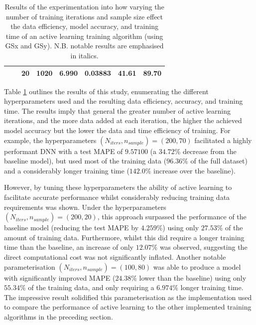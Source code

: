 \documentclass[a4paper, 11pt]{report}
\begin{document}
\begin{table}[ht]
\begin{tabular}{|l|l|l|l|l|l|l|l|}
        \cline{3-8}
                                                                                &                                                                                 & 20                                                                     & 1020                                                                       & 6.990                                                                                             & 0.03883          & 41.61          & 89.70                                                                       \\
        \hline
        \end{tabular}
        \caption{\centering Results of the experimentation into how varying the number of training iterations and sample size effect the data efficiency, model accuracy, and training time of an active learning training algorithm (using GSx and GSy). N.B. notable results are emphasised in italics.}
        \label{table: al-efficiency}
    \end{table}


    Table \ref{table: al-efficiency} outlines the results of this study, enumerating the different hyperparameters used and the resulting data efficiency, accuracy, and training time. The results imply that general the greater number of active learning iterations, and the more data added at each iteration, the higher the achieved model accuracy but the lower the data and time efficiency of training. For example, the hyperparameters $(N_{iters}, n_{sample}) = (200, 70)$ facilitated a highly performant DNN with a test MAPE of $9.57100$ (a $34.72\%$ decrease from the baseline model), but used most of the training data ($96.36\%$ of the full dataset) and a considerably longer training time ($142.0\%$ increase over the baseline).

    However, by tuning these hyperparameters the ability of active learning to facilitate accurate performance whilst considerably reducing training data requirements was shown. Under the hyperparameters $(N_{iters}, n_{sample}) = (200, 20)$, this approach surpassed the performance of the baseline model (reducing the test MAPE by $4.259\%$) using only $27.53\%$ of the amount of training data. Furthermore, whilst this did require a longer training time than the baseline, an increase of only $12.07\%$ was observed, suggesting the direct computational cost was not significantly inflated. Another notable parameterisation $(N_{iters}, n_{sample}) = (100, 80)$ was able to produce a model with significantly improved MAPE ($24.38\%$ lower than the baseline) using only $55.34\%$ of the training data, and only requiring a $6.974\%$ longer training time. The impressive result solidified this parameterisation as the implementation used to compare the performance of active learning to the other implemented training algorithms in the preceding section.
\end{document}

